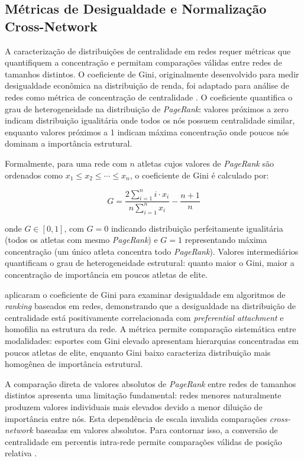 \subsection{Métricas de Desigualdade e Normalização Cross-Network}

A caracterização de distribuições de centralidade em redes requer métricas que quantifiquem a concentração e permitam comparações válidas entre redes de tamanhos distintos. O coeficiente de Gini, originalmente desenvolvido para medir desigualdade econômica na distribuição de renda, foi adaptado para análise de redes como métrica de concentração de centralidade \cite{Fabbri2022Inequality}. O coeficiente quantifica o grau de heterogeneidade na distribuição de \textit{PageRank}{}: valores próximos a zero indicam distribuição igualitária onde todos os nós possuem centralidade similar, enquanto valores próximos a 1 indicam máxima concentração onde poucos nós dominam a importância estrutural.

Formalmente, para uma rede com $n$ atletas cujos valores de \textit{PageRank}{} são ordenados como $x_1 \leq x_2 \leq \cdots \leq x_n$, o coeficiente de Gini é calculado por:

\begin{equation}
    G = \frac{2 \sum_{i=1}^{n} i \cdot x_i}{n \sum_{i=1}^{n} x_i} - \frac{n+1}{n}
\end{equation}

\noindent onde $G \in [0,1]$, com $G=0$ indicando distribuição perfeitamente igualitária (todos os atletas com mesmo \textit{PageRank}{}) e $G=1$ representando máxima concentração (um único atleta concentra todo \textit{PageRank}{}). Valores intermediários quantificam o grau de heterogeneidade estrutural: quanto maior o Gini, maior a concentração de importância em poucos atletas de elite.

 aplicaram o coeficiente de Gini para examinar desigualdade em algoritmos de \textit{ranking} baseados em redes, demonstrando que a desigualdade na distribuição de centralidade está positivamente correlacionada com \textit{preferential attachment} e homofilia na estrutura da rede. A métrica permite comparação sistemática entre modalidades: esportes com Gini elevado apresentam hierarquias concentradas em poucos atletas de elite, enquanto Gini baixo caracteriza distribuição mais homogênea de importância estrutural.

A comparação direta de valores absolutos de \textit{PageRank} entre redes de tamanhos distintos apresenta uma limitação fundamental: redes menores naturalmente produzem valores individuais mais elevados devido a menor diluição de importância entre nós. Esta dependência de escala invalida comparações \textit{cross-network} baseadas em valores absolutos. Para contornar isso, a conversão de centralidade em percentis intra-rede permite comparações válidas de posição relativa \cite{Eriksson2022NetworkMetadata}.

